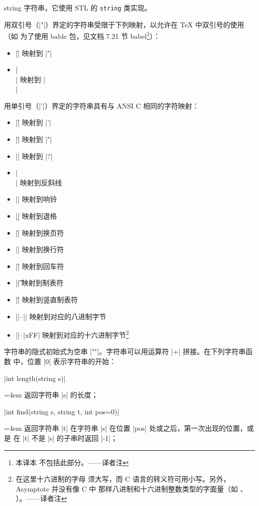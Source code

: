 \documentclass[nofonts,CJKnormalspaces]{ctexbook}[2009/05/20]
\makeatletter
\newenvironment{funclist}{\trivlist
  \parindent=0pt
\item[]
  \def\item{\medskip\par\leftskip=0pt}
  \def\go{\par\leftskip=4em}}
{\endtrivlist}
\newenvironment{typelist}{\itemize
  \let\old@item\@item
  \def\@item[##1]{\expandafter\old@item[\ttfamily\color{type!50!black}##1]}}
{\enditemize}
\newcommand*\prgname[1]{\textsf{#1}}
\newcommand\transnote[1]{\footnote{#1——译者注}}
\makeatother
\begin{document}
\begin{typelist}
\item[string] 字符串，它使用 STL 的 \verb=string= 类实现。

用双引号（|"|）界定的字符串受限于下列映射，以允许在 \TeX{} 中双引号的使用（如
为了使用 \prgname{bable} 包，见文档 7.21 节 \prgname{babel}\transnote{本译本
不包括此部分。}）：
\begin{itemize}
  \item |\"| 映射到 |"|
  \item |\\| 映射到 |\\|
\end{itemize}

用单引号（|'|）界定的字符串具有与 ANSI C 相同的字符映射：
\begin{itemize}
  \item |\'| 映射到 |'|
  \item |\"| 映射到 |"|
  \item |\?| 映射到 |?|
  \item |\\| 映射到反斜线
  \item |\a| 映射到响铃
  \item |\b| 映射到退格
  \item |\f| 映射到换页符
  \item |\n| 映射到换行符
  \item |\r| 映射到回车符
  \item |\t| 映射到制表符
  \item |\v| 映射到竖直制表符
  \item |\0|--|| 映射到对应的八进制字节
  \item ||--|xFF| 映射到对应的十六进制字节\transnote{在这里十六进制的字母
须大写，而 C 语言的转义符可用小写。另外，\prgname{Asymptote} 并没有像 C 中
那样八进制和十六进制整数类型的字面量（如 \inlinecode{0177}、
\inlinecode{0x2F}）。}
\end{itemize}

字符串的隐式初始式为空串 |""|。字符串可以用运算符 |+| 拼接。在下列字符串函数
中，位置 |0| 表示字符串的开始：
\begin{funclist}
\item |int length(string s)| \go
  返回字符串 |s| 的长度；

\item |int find(string s, string t, int pos=0)| \go
  返回字符串 |t| 在字符串 |s| 在位置 |pos| 处或之后，第一次出现的位置，或是
  在 |t| 不是 |s| 的子串时返回 |-1|；


\end{funclist}
\end{typelist}
\end{document}
